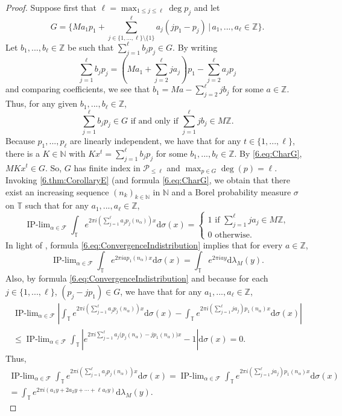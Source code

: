 \documentclass[11pt,american,preprint]{elsarticle}
\numberwithin{equation}{section}
\theoremstyle{plain}
\theoremstyle{plain*}
\theoremstyle{plain}
\theoremstyle{plain*}
\theoremstyle{plain}
\theoremstyle{plain*}
\theoremstyle{remark}
\theoremstyle{remark*}
\theoremstyle{remark}
\theoremstyle{remark*}
\theoremstyle{remark}
\theoremstyle{remark*}
\theoremstyle{plain}
\theoremstyle{definition}
\theoremstyle{plain}
\theoremstyle{plain} %
\newcommand{\N}{\mathbb{N}}
\newcommand{\Z}{\mathbb{Z}}
\begin{document}
\begin{proof}
 Suppose first that $\ell=\max_{1\leq j\leq \ell}\deg p_j$ and let 
$$G=\{Ma_1p_1+\sum_{j\in\{1,...,\ell\}\setminus\{1\}}^\ell a_j(jp_1-p_j)\,|\,a_1,...,a_\ell\in \Z\}.$$
Let $b_1,...,b_\ell\in\Z$ be such that $\sum_{j=1}^\ell b_jp_j\in G$. By writing 
$$
\sum_{j=1}^\ell b_jp_j =\left(Ma_1+\sum_{j=2}^\ell ja_j\right)p_1-\sum_{j=2}^\ell a_jp_j
$$
and comparing coefficients, we see that  
$b_1=Ma-\sum_{j=2}^\ell jb_j$
for some $a\in\Z$. Thus,  for any given $b_1,...,b_\ell\in\Z$, 
\begin{equation}\label{6.eq:CharG}
\sum_{j=1}^\ell b_jp_j\in G\text{ if and only if }\sum_{j=1}^\ell jb_j\in M\Z.
\end{equation}
Because $p_1,...,p_\ell$ are linearly independent, we have that for any $t\in\{1,...,\ell\}$, there is  a $K\in\N$ with $Kx^t=\sum_{j=1}^\ell b_jp_j$ for some $b_1,...,b_\ell\in\Z$. By \eqref{6.eq:CharG},  $MKx^t\in G$. So, $G$ has finite index in $\mathcal P_{\leq \ell}$ and   $\max_{p\in G}\deg(p)=\ell$. Invoking \cref{6.thm:CorollaryE} (and formula \eqref{6.eq:CharG}, we obtain that there exist an increasing sequence $(n_k)_{k\in\N}$ in $\N$ and a Borel probability measure $\sigma$ on $\mathbb T$ such that for any $a_1,...,a_\ell\in\Z$,
\begin{equation}\label{6.eq:ConvergenceIndistribution}
\mathop{\text{IP-lim}}_{\alpha\in\mathcal F}\int_\mathbb T e^{2\pi i \left(\sum_{j=1}^\ell a_jp_j(n_\alpha)\right)x}\text{d}\sigma(x)=\begin{cases}
1\text{ if }\sum_{j=1}^\ell ja_j\in M\Z,\\
0\text{ otherwise. } 
    \end{cases}
\end{equation}
In light of , formula  \eqref{6.eq:ConvergenceIndistribution}  implies that  for every $a\in\Z$,
$$
\mathop{\text{IP-lim}}_{\alpha\in\mathcal F}\int_\mathbb T e^{2\pi iap_1(n_\alpha)x}\text{d}\sigma(x)=\int_\mathbb T e^{2\pi i ay}\text{d}\lambda_M(y).
$$
Also, by formula \eqref{6.eq:ConvergenceIndistribution} and because for each $j\in\{1,...,\ell\}$, $(p_j-jp_1)\in G$, we have that for any $a_1,...,a_\ell\in\Z$,
\begin{multline*}
\mathop{\text{IP-lim}}_{\alpha\in\mathcal F}\left|\int_\mathbb T e^{2\pi i \left(\sum_{j=1}^\ell a_jp_j(n_\alpha)\right)x}\text{d}\sigma(x)-\int_\mathbb T e^{2\pi i \left(\sum_{j=1}^\ell ja_j\right)p_1(n_\alpha)x}\text{d}\sigma(x)\right|\\
\leq \mathop{\text{IP-lim}}_{\alpha\in\mathcal F}\int_\mathbb T \left|e^{2\pi i \sum_{j=1}^\ell a_j\Big(p_j(n_\alpha)-jp_1(n_\alpha)\Big)x}-1\right|\text{d}\sigma(x)=0.
\end{multline*}
Thus, 
\begin{multline*}
    \mathop{\text{IP-lim}}_{\alpha\in\mathcal F}\int_\mathbb T e^{2\pi i \left(\sum_{j=1}^\ell a_jp_j(n_\alpha)\right)x}\text{d}\sigma(x)=\mathop{\text{IP-lim}}_{\alpha\in\mathcal F}\int_\mathbb T e^{2\pi i \left(\sum_{j=1}^\ell ja_j\right)p_1(n_\alpha)x}\text{d}\sigma(x)\\
= \int_\mathbb T e^{2\pi i (a_1y+2a_2y+\cdots+\ell a_\ell y)}\text{d}\lambda_M(y).
\end{multline*}



\end{proof}
\end{document}

